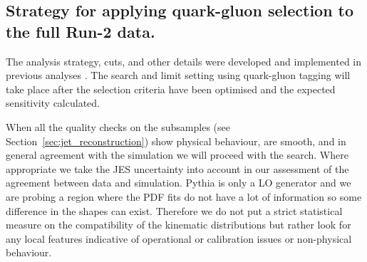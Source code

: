 \subsection{Strategy for applying quark-gluon selection to the full Run-2 data.}
\label{sec:2018data}

The analysis strategy, cuts, and other details were developed and implemented in previous analyses \cite{Aad:2019hjw,Nishu:2646455}.  
The search and limit setting using quark-gluon tagging will take place after the selection criteria 
have been optimised and the expected sensitivity calculated.

When all the quality checks on the subsamples (see Section~\ref{sec:jet_reconstruction})
show physical behaviour, are smooth, and in general agreement
with the simulation we will proceed with the search.
Where appropriate we take the
JES uncertainty into account in our assessment of the agreement
between data and simulation. 
Pythia is only a LO generator
and we are probing a region where the PDF fits do not
have a lot of information so some difference in the shapes
can exist. Therefore we do not put a strict statistical measure
on the compatibility of the kinematic distributions but rather
look for any local features indicative of operational or
calibration issues or non-physical behaviour.
